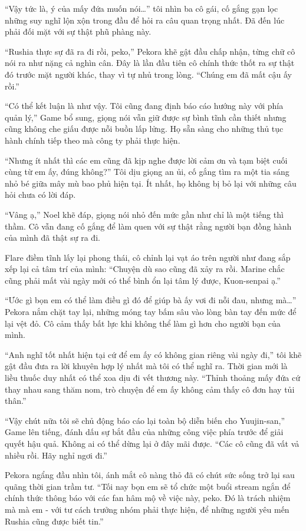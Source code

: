 \documentclass[../main.tex]{subfiles}
\begin{document}
``Vậy tức là, ý của mấy đứa muốn nói\dots'' tôi nhìn ba cô gái, cố gắng gạn lọc những suy nghĩ lộn xộn trong đầu để hỏi ra câu quan trọng nhất. Đã đến lúc phải đối mặt với sự thật phũ phàng này.

``Rushia thực sự đã ra đi rồi, peko,'' Pekora khẽ gật đầu chấp nhận, từng chữ cô nói ra như nặng cả nghìn cân. Đây là lần đầu tiên cô chính thức thốt ra sự thật đó trước mặt người khác, thay vì tự nhủ trong lòng. ``Chúng em đã mất cậu ấy rồi.''

``Có thể kết luận là như vậy. Tôi cũng đang định báo cáo hướng này với phía quản lý,'' Game bổ sung, giọng nói vẫn giữ được sự bình tĩnh cần thiết nhưng cũng không che giấu được nỗi buồn lấp lửng. Họ sẵn sàng cho những thủ tục hành chính tiếp theo mà công ty phải thực hiện.

``Nhưng ít nhất thì các em cũng đã kịp nghe được lời cảm ơn và tạm biệt cuối cùng từ em ấy, đúng không?'' Tôi dịu giọng an ủi, cố gắng tìm ra một tia sáng nhỏ bé giữa mây mù bao phủ hiện tại. Ít nhất, họ không bị bỏ lại với những câu hỏi chưa có lời đáp.

``Vâng ạ,'' Noel khẽ đáp, giọng nói nhỏ đến mức gần như chỉ là một tiếng thì thầm. Cô vẫn đang cố gắng để làm quen với sự thật rằng người bạn đồng hành của mình đã thật sự ra đi.

Flare điềm tĩnh lấy lại phong thái, cô chỉnh lại vạt áo trên người như đang sắp xếp lại cả tâm trí của mình: ``Chuyện dù sao cũng đã xảy ra rồi. Marine chắc cũng phải mất vài ngày mới có thể bình ổn lại tâm lý được, Kuon-senpai ạ.''

``Ước gì bọn em có thể làm điều gì đó để giúp bà ấy vơi đi nỗi đau, nhưng mà\dots'' Pekora nắm chặt tay lại, những móng tay bấm sâu vào lòng bàn tay đến mức để lại vệt đỏ. Cô cảm thấy bất lực khi không thể làm gì hơn cho người bạn của mình.

``Anh nghĩ tốt nhất hiện tại cứ để em ấy có không gian riêng vài ngày đi,'' tôi khẽ gật đầu đưa ra lời khuyên hợp lý nhất mà tôi có thể nghĩ ra. Thời gian mới là liều thuốc duy nhất có thể xoa dịu đi vết thương này. ``Thỉnh thoảng mấy đứa cứ thay nhau sang thăm nom, trò chuyện để em ấy không cảm thấy cô đơn hay tủi thân.''

``Vậy chút nữa tôi sẽ chủ động báo cáo lại toàn bộ diễn biến cho Yuujin-san,'' Game lên tiếng, đánh dấu sự bắt đầu của những công việc phía trước để giải quyết hậu quả. Không ai có thể dừng lại ở đây mãi được. ``Các cô cũng đã vất vả nhiều rồi. Hãy nghỉ ngơi đi.''

Pekora ngẩng đầu nhìn tôi, ánh mắt cô nàng thỏ đã có chút sức sống trở lại sau quãng thời gian trầm tư. ``Tối nay bọn em sẽ tổ chức một buổi stream ngắn để chính thức thông báo với các fan hâm mộ về việc này, peko. Đó là trách nhiệm mà mà em - với tư cách trưởng nhóm phải thực hiện, để những người yêu mến Rushia cũng được biết tin.''
\end{document}
